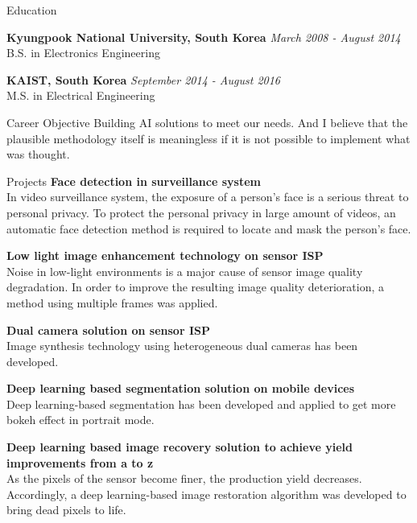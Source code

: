 \documentclass{resume}
\begin{document}
\begin{rSection}{Education}


{\bf Kyungpook National University, South Korea} \hfill {\em March 2008 - August 2014} 
\\ B.S. in Electronics Engineering\hfill 

{\bf KAIST, South Korea} \hfill {\em September 2014 - August 2016} 
\\ M.S. in Electrical Engineering\hfill

\end{rSection}

\begin{rSection}{Career Objective}
 Building AI solutions to meet our needs.
 And I believe that the plausible methodology itself is meaningless if it is not possible to implement what was thought.
\end{rSection}

\begin{rSection}{Projects}
{\bf Face detection in surveillance system }
\\ In video surveillance system, the exposure of a person’s face is a serious threat to personal privacy.
To protect the personal privacy in large amount of videos, an automatic face detection method is required to locate and mask the person’s face.

{\bf Low light image enhancement technology on sensor ISP}
\\ Noise in low-light environments is a major cause of sensor image quality degradation. In order to improve the resulting image quality deterioration, a method using multiple frames was applied.

{\bf Dual camera solution on sensor ISP}
\\ Image synthesis technology using heterogeneous dual cameras has been developed.

{\bf Deep learning based segmentation solution on mobile devices}
\\ Deep learning-based segmentation has been developed and applied to get more bokeh effect in portrait mode.

{\bf Deep learning based image recovery solution to achieve yield improvements from a to z}
\\ As the pixels of the sensor become finer, the production yield decreases. Accordingly, a deep learning-based image restoration algorithm was developed to bring dead pixels to life.

\end{rSection}
\end{document}
